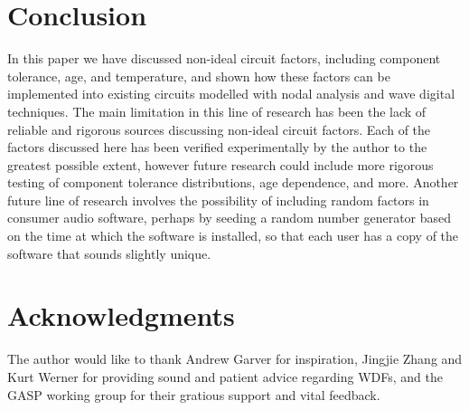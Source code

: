 \documentclass[twoside,a4paper]{article}
\begin{document}
\section{Conclusion} \label{sec:conclusion}
%
In this paper we have discussed non-ideal circuit factors, including
component tolerance, age, and temperature, and shown how these factors
can be implemented into existing circuits modelled with nodal analysis
and wave digital techniques.
\newline\newline
The main limitation in this line of research has been the lack of
reliable and rigorous sources discussing non-ideal circuit factors.
Each of the factors discussed here has been verified experimentally
by the author to the greatest possible extent, however future research
could include more rigorous testing of component tolerance distributions,
age dependence, and more. Another future line of research involves the
possibility of including random factors in consumer audio software, perhaps
by seeding a random number generator based on the time at which the
software is installed, so that each user has a copy of the software that
sounds slightly unique.

\section{Acknowledgments}
%
The author would like to thank Andrew Garver for inspiration, Jingjie Zhang
and Kurt Werner for providing sound and patient advice regarding WDFs, and the
GASP working group for their gratious support and vital feedback.

\nocite{*}


\end{document}
